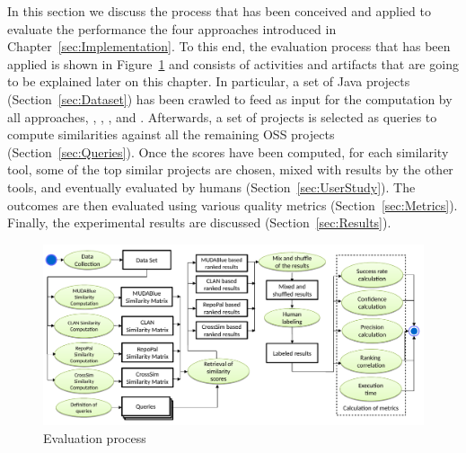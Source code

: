 




In this section we discuss the process that has been conceived and applied to evaluate the performance the four approaches introduced in Chapter~\ref{sec:Implementation}. To this end, the evaluation process that has been applied is shown in Figure~\ref{fig:EvaluationProcess} and consists of activities and artifacts that are going to be explained later on this chapter. In particular, a set of Java projects (Section~\ref{sec:Dataset}) has been crawled to feed as input for the computation by all approaches, \ie \MUDABlue, \CLAN, \RepoPal, and \CrossSim. Afterwards, a set of projects is selected as queries to compute similarities against all the remaining OSS projects (Section~\ref{sec:Queries}). Once the scores have been computed, for each similarity tool, some of the top similar projects are chosen, mixed with results by the other tools, and eventually evaluated by humans (Section~\ref{sec:UserStudy}). The outcomes are then evaluated using various quality metrics (Section~\ref{sec:Metrics}). Finally, the experimental results are discussed (Section~\ref{sec:Results}).


\begin{figure}[h!]
	\centering
	\includegraphics[width=0.99\linewidth]{images/EvaluationProcess}
	\caption{Evaluation process}
	\label{fig:EvaluationProcess}
\end{figure}








